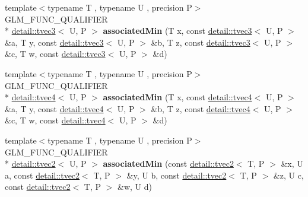 \begin{DoxyCompactItemize}
\item 
\hypertarget{namespaceglm_a8c91e3eddf5a5aa17cad12b291acccd6}{{\footnotesize template$<$typename T , typename U , precision P$>$ }\\G\-L\-M\-\_\-\-F\-U\-N\-C\-\_\-\-Q\-U\-A\-L\-I\-F\-I\-E\-R \\*
\hyperlink{structglm_1_1detail_1_1tvec3}{detail\-::tvec3}$<$ U, P $>$ {\bfseries associated\-Min} (T x, const \hyperlink{structglm_1_1detail_1_1tvec3}{detail\-::tvec3}$<$ U, P $>$ \&a, T y, const \hyperlink{structglm_1_1detail_1_1tvec3}{detail\-::tvec3}$<$ U, P $>$ \&b, T z, const \hyperlink{structglm_1_1detail_1_1tvec3}{detail\-::tvec3}$<$ U, P $>$ \&c, T w, const \hyperlink{structglm_1_1detail_1_1tvec3}{detail\-::tvec3}$<$ U, P $>$ \&d)}\label{namespaceglm_a8c91e3eddf5a5aa17cad12b291acccd6}

\item 
\hypertarget{namespaceglm_aaffb9a5ffaedf4b36f8ba5279b1471bd}{{\footnotesize template$<$typename T , typename U , precision P$>$ }\\G\-L\-M\-\_\-\-F\-U\-N\-C\-\_\-\-Q\-U\-A\-L\-I\-F\-I\-E\-R \\*
\hyperlink{structglm_1_1detail_1_1tvec4}{detail\-::tvec4}$<$ U, P $>$ {\bfseries associated\-Min} (T x, const \hyperlink{structglm_1_1detail_1_1tvec4}{detail\-::tvec4}$<$ U, P $>$ \&a, T y, const \hyperlink{structglm_1_1detail_1_1tvec4}{detail\-::tvec4}$<$ U, P $>$ \&b, T z, const \hyperlink{structglm_1_1detail_1_1tvec4}{detail\-::tvec4}$<$ U, P $>$ \&c, T w, const \hyperlink{structglm_1_1detail_1_1tvec4}{detail\-::tvec4}$<$ U, P $>$ \&d)}\label{namespaceglm_aaffb9a5ffaedf4b36f8ba5279b1471bd}

\item 
\hypertarget{namespaceglm_a84819fd961424ab2dbc226ed17025368}{{\footnotesize template$<$typename T , typename U , precision P$>$ }\\G\-L\-M\-\_\-\-F\-U\-N\-C\-\_\-\-Q\-U\-A\-L\-I\-F\-I\-E\-R \\*
\hyperlink{structglm_1_1detail_1_1tvec2}{detail\-::tvec2}$<$ U, P $>$ {\bfseries associated\-Min} (const \hyperlink{structglm_1_1detail_1_1tvec2}{detail\-::tvec2}$<$ T, P $>$ \&x, U a, const \hyperlink{structglm_1_1detail_1_1tvec2}{detail\-::tvec2}$<$ T, P $>$ \&y, U b, const \hyperlink{structglm_1_1detail_1_1tvec2}{detail\-::tvec2}$<$ T, P $>$ \&z, U c, const \hyperlink{structglm_1_1detail_1_1tvec2}{detail\-::tvec2}$<$ T, P $>$ \&w, U d)}\label{namespaceglm_a84819fd961424ab2dbc226ed17025368}


\end{DoxyCompactItemize}
